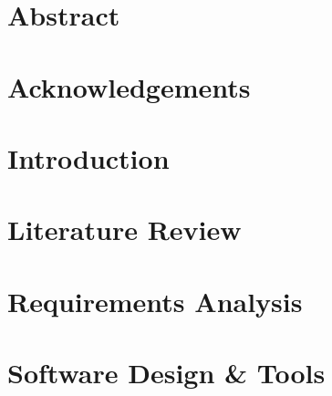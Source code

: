 \documentclass[12pt, a4paper, twoside]{book}
\begin{document}
\pagestyle{empty}


\fancyhead{}
\fancyhead[LO]{\leftmark}
\fancyhead[RE]{\leftmark}
\setlength{\headheight}{15pt}
\renewcommand{\headrulewidth}{0.4pt}
\renewcommand{\footrulewidth}{0.4pt}
\renewcommand{\chaptermark}[1]{%
\markboth{#1}{}}

\chapter{Abstract}



\clearpage

\chapter{Acknowledgements}



\clearpage

\tableofcontents
{}
\clearpage

\listoffigures
{}
\clearpage

\listoftables
{}
\clearpage

\printglossary[title=Acronyms, toctitle=Acronyms]
\clearpage

\mainmatter

\pagestyle{fancy}

\chapter{Introduction}
\label{chp:introduction}

    
\chapter{Literature Review}
\label{chp:literature_review}

    
\chapter{Requirements Analysis}
\label{chp:requirements_analysis}


\chapter{Software Design \& Tools}
\label{chp:software_design}

\end{document}
